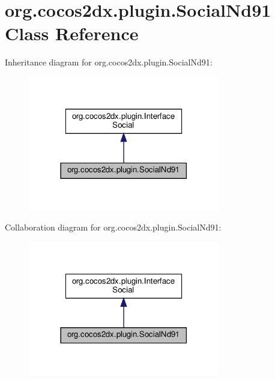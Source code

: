 \hypertarget{classorg_1_1cocos2dx_1_1plugin_1_1SocialNd91}{}\section{org.\+cocos2dx.\+plugin.\+Social\+Nd91 Class Reference}
\label{classorg_1_1cocos2dx_1_1plugin_1_1SocialNd91}


Inheritance diagram for org.\+cocos2dx.\+plugin.\+Social\+Nd91\+:
\nopagebreak
\begin{figure}[H]
\begin{center}
\leavevmode
\includegraphics[width=237pt]{classorg_1_1cocos2dx_1_1plugin_1_1SocialNd91__inherit__graph}
\end{center}
\end{figure}


Collaboration diagram for org.\+cocos2dx.\+plugin.\+Social\+Nd91\+:
\nopagebreak
\begin{figure}[H]
\begin{center}
\leavevmode
\includegraphics[width=237pt]{classorg_1_1cocos2dx_1_1plugin_1_1SocialNd91__coll__graph}
\end{center}
\end{figure}

